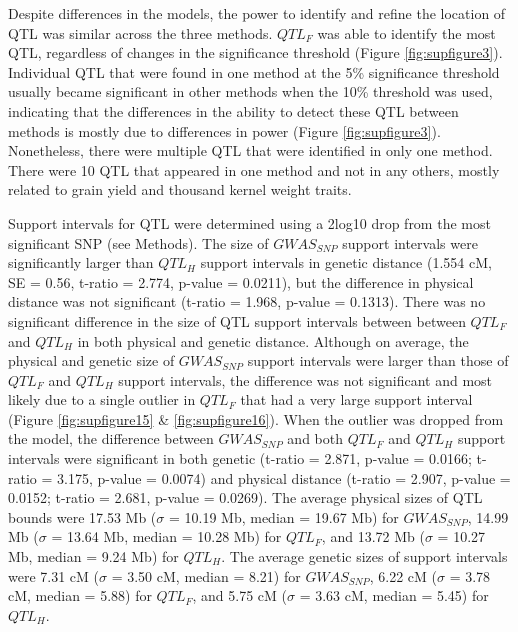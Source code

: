 \documentclass[article,9pt,twocolumn,twoside]{rilabRxiv}
\begin{document}
Despite differences in the models, the power to identify and refine the location of QTL was similar across the three methods.
$QTL_F$ was able to identify the most QTL, regardless of changes in the significance threshold (Figure \ref{fig:supfigure3}).
Individual QTL that were found in one method at the 5\% significance threshold usually became significant in other methods when the 10\% threshold was used, indicating that the differences in the ability to detect these QTL between methods is mostly due to differences in power (Figure \ref{fig:supfigure3}).
Nonetheless, there were multiple QTL that were identified in only one method. There were 10 QTL that appeared in one method and not in any others, mostly related to grain yield and thousand kernel weight traits.

Support intervals for QTL were determined using a 2log10 drop from the most significant SNP (see Methods).
The size of $GWAS_{SNP}$ support intervals were significantly larger than $QTL_H$ support intervals in genetic distance (1.554 cM, SE = 0.56, t-ratio = 2.774, p-value = 0.0211), but the difference in physical distance was not significant (t-ratio = 1.968, p-value = 0.1313).
There was no significant difference in the size of QTL support intervals between between $QTL_F$ and $QTL_H$ in both physical and genetic distance.
Although on average, the physical and genetic size of $GWAS_{SNP}$ support intervals were larger than those of $QTL_F$ and $QTL_H$ support intervals, the difference was not significant and most likely due to a single outlier in $QTL_F$ that had a very large support interval (Figure \ref{fig:supfigure15} \& \ref{fig:supfigure16}).
When the outlier was dropped from the model, the difference between $GWAS_{SNP}$ and both $QTL_F$ and $QTL_H$ support intervals were significant in both genetic (t-ratio = 2.871, p-value = 0.0166; t-ratio = 3.175, p-value = 0.0074) and physical distance (t-ratio = 2.907, p-value = 0.0152; t-ratio = 2.681, p-value = 0.0269).
The average physical sizes of QTL bounds were 17.53 Mb ($\sigma$ = 10.19 Mb, median = 19.67 Mb) for $GWAS_{SNP}$, 14.99 Mb ($\sigma$ = 13.64 Mb, median = 10.28 Mb) for $QTL_F$, and 13.72 Mb ($\sigma$ = 10.27 Mb, median = 9.24 Mb) for $QTL_H$.
The average genetic sizes of support intervals were 7.31 cM ($\sigma$ = 3.50 cM, median = 8.21) for $GWAS_{SNP}$, 6.22 cM ($\sigma$ = 3.78 cM, median = 5.88) for $QTL_F$, and 5.75 cM ($\sigma$ = 3.63 cM, median = 5.45) for $QTL_H$.
\end{document}
